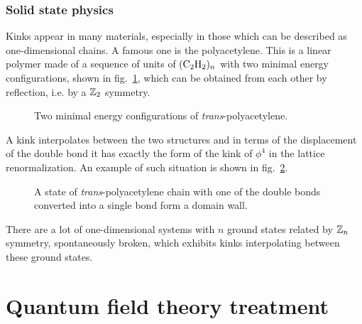 \documentclass[../main/main.tex]{subfiles}
\begin{document}
\subsubsection{Solid state physics}

Kinks appear in many materials, especially in those which can be described as one-dimensional chains. A famous one is the polyacetylene. This is a linear polymer made of a sequence of units of $(\text C_2\text H_2)_n$ with two minimal energy configurations, shown in fig.~\ref{fig:polyacetylene}, which can be obtained from each other by reflection, i.e. by a $\mathbb{Z}_2$ symmetry.

\begin{figure}[h]
	\centering
	\quad
	\caption{Two minimal energy configurations of \emph{trans}-polyacetylene.}
	\label{fig:polyacetylene}
\end{figure}

A kink interpolates between the two structures and in terms of the displacement of the double bond it has exactly the form of the kink of $\phi^4$ in the lattice renormalization. An example of such situation is shown in fig.~\ref{fig:kink-polyacetylene}.

\begin{figure}[h]
	\centering
	\caption{A state of \emph{trans}-polyacetylene chain with one of the double bonds\\converted into a single bond form a domain wall.}
	\label{fig:kink-polyacetylene}
\end{figure}

There are a lot of one-dimensional systems with $n$ ground states related by $\mathbb{Z}_n$ symmetry, spontaneously broken, which exhibits kinks interpolating between these ground states. 

\section{Quantum field theory treatment}
\end{document}
